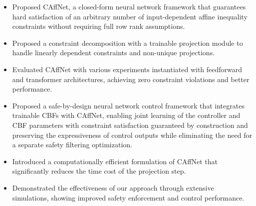 \begin{itemize}
  \item Proposed CAffNet, a closed-form neural network framework that guarantees hard satisfaction of an arbitrary number of input-dependent affine inequality constraints without requiring full row rank assumptions.
  \item Proposed a constraint decomposition with a trainable projection module to handle linearly dependent constraints and non-unique projections.
  \item Evaluated CAffNet with various experiments instantiated with feedforward and transformer architectures, achieving zero constraint violations and better performance.
\end{itemize}
\begin{itemize}
  \item Proposed a safe-by-design neural network control framework that integrates trainable CBFs with CAffNet, enabling joint learning of the controller and CBF parameters with constraint satisfaction guaranteed by construction and preserving the expressiveness of control outputs while eliminating the need for a separate safety filtering optimization.
  \item Introduced a computationally efficient formulation of CAffNet that significantly reduces the time cost of the projection step.
  \item Demonstrated the effectiveness of our approach through extensive simulations, showing improved safety enforcement and control performance.
\end{itemize}

